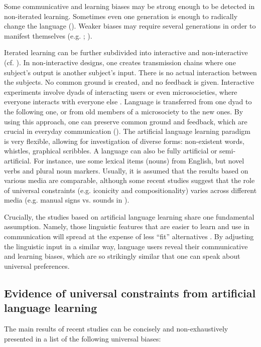 \documentclass[output=paper]{langsci/langscibook}
\begin{document}
Some communicative and learning biases may be strong enough to be detected in non-iterated learning. Sometimes even one generation is enough to radically change the language (\citealt{Hudson2009_ChangeLearn}). Weaker biases may require several generations in order to manifest themselves (e.g. \citealt{RealiGriffiths2009}; \citealt{SmithWonnacott2010}). 

Iterated learning can be further subdivided into interactive and non-interactive (cf. \citealt{Tamariz2017}). In non-interactive designs, one creates transmission chains where one subject’s output is another subject’s input. There is no actual interaction between the subjects. No common ground is created, and no feedback is given. Interactive experiments involve dyads of interacting users or even microsocieties, where everyone interacts with everyone else \citep{Tamariz2017}. Language is transferred from one dyad to the following one, or from old members of a microsociety to the new ones. By using this approach, one can preserve common ground and feedback, which are crucial in everyday communication (\citealt{CaldwellSmith2012}). 
\newpage
The artificial language learning paradigm is very flexible, allowing for investigation of diverse forms: non-existent words, whistles, graphical scribbles. A language can also be fully artificial or semi-artificial. For instance, \citet{SmithWonnacott2010} use some lexical items (nouns) from English, but novel verbs and plural noun markers. Usually, it is assumed that the results based on various media are comparable, although some recent studies suggest that the role of universal constraints (e.g. iconicity and compositionality) varies across different media (e.g. manual signs vs. sounds in \citealt{LittleEtAl2017}).

Crucially, the studies based on artificial language learning share one fundamental assumption. Namely, those linguistic features that are easier to learn and use in communication will spread at the expense of less “fit” alternatives \citep{SmithEtAl2017}. By adjusting the linguistic input in a similar way, language users reveal their communicative and learning biases, which are so strikingly similar that one can speak about universal preferences. 

\subsection{Evidence of universal constraints from artificial language learning}

The main results of recent studies can be concisely and non-exhaustively presented in a list of the following universal biases: 
\end{document}
